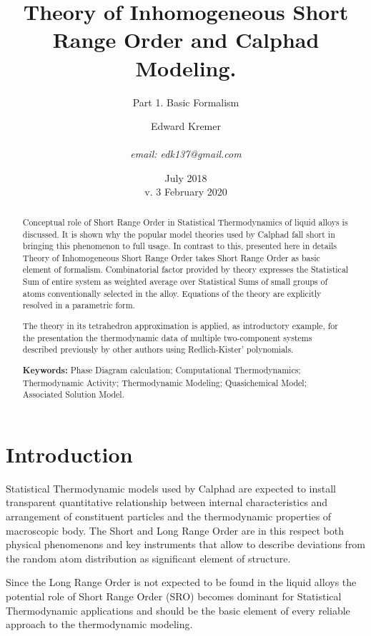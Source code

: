 \documentclass[12pt,abstract]{scrartcl}
\title{Theory of Inhomogeneous Short Range Order and Calphad Modeling. }
\author{Edward Kremer \\ \\ \textit{email: edk137@gmail.com}}
\subtitle{Part 1. Basic Formalism}
\date{July 2018 \\ v. 3 \quad February 2020}
\begin{document}
\maketitle

\begin{abstract}

	Conceptual role of Short Range Order in Statistical Thermodynamics of liquid alloys is discussed. It is shown why the popular model theories used by Calphad fall short in bringing this phenomenon to full usage. In contrast to this, presented here in details Theory of Inhomogeneous Short Range Order takes Short Range Order as basic element of formalism. Combinatorial factor provided by theory expresses the Statistical Sum of entire system as weighted  average over Statistical Sums of small groups of atoms conventionally selected in the alloy.
		Equations of the theory are explicitly resolved in a parametric form.
		
		The theory in its tetrahedron approximation is applied,  as introductory example, for the presentation  the thermodynamic data of multiple two-component systems described previously by other authors using Redlich-Kister' polynomials.

\textbf{Keywords:} Phase Diagram calculation; Computational Thermodynamics; Thermodynamic Activity; Thermodynamic Modeling; Quasichemical Model; Associated Solution Model.

\end{abstract}



\section{Introduction}

Statistical Thermodynamic models used by Calphad \cite{hanslukas2007} are expected  to install transparent quantitative relationship between internal characteristics and arrangement of constituent particles and the thermodynamic properties of macroscopic body.
The  Short and Long Range Order \cite{hanslukas2007,Hillert2008} are in this respect both physical phenomenons and key instruments that allow to describe deviations from the random atom distribution as significant element of  structure.


Since the Long Range Order is not expected to be found in the liquid alloys \cite{Hillert2008} the potential role of Short Range Order (SRO) becomes dominant for Statistical Thermodynamic applications and should be the basic element of every reliable approach to the  thermodynamic modeling.
\end{document}
